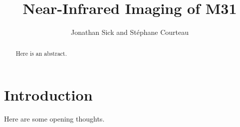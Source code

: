 \documentclass{aastex}
\begin{document}
\title{Near-Infrared Imaging of M31}
\author{Jonathan Sick and Stéphane Courteau}

\begin{abstract}
Here is an abstract.
\end{abstract}

\section{Introduction}

Here are some opening thoughts.
\end{document}
